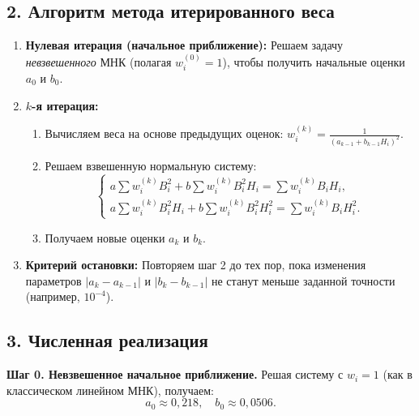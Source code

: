 \documentclass{article}
\begin{document}
\subsection*{2. Алгоритм метода итерированного веса}

\begin{enumerate}
    \item \textbf{Нулевая итерация (начальное приближение):} Решаем задачу \textit{невзвешенного} МНК (полагая $w_i^{(0)} = 1$), чтобы получить начальные оценки $a_0$ и $b_0$.
    \item \textbf{$k$-я итерация:} 
    \begin{enumerate}
        \item Вычисляем веса на основе предыдущих оценок: $w_i^{(k)} = \frac{1}{(a_{k-1} + b_{k-1}H_i)^2}$.
        \item Решаем взвешенную нормальную систему:
        \begin{equation}
        \begin{cases}
        a \sum w_i^{(k)} B_i^2 + b \sum w_i^{(k)} B_i^2 H_i = \sum w_i^{(k)} B_i H_i, \\
        a \sum w_i^{(k)} B_i^2 H_i + b \sum w_i^{(k)} B_i^2 H_i^2 = \sum w_i^{(k)} B_i H_i^2.
        \end{cases}
        \end{equation}
        \item Получаем новые оценки $a_k$ и $b_k$.
    \end{enumerate}
    \item \textbf{Критерий остановки:} Повторяем шаг 2 до тех пор, пока изменения параметров $|a_k - a_{k-1}|$ и $|b_k - b_{k-1}|$ не станут меньше заданной точности (например, $10^{-4}$).
\end{enumerate}

\subsection*{3. Численная реализация}

\textbf{Шаг 0. Невзвешенное начальное приближение.}
Решая систему с $w_i = 1$ (как в классическом линейном МНК), получаем:
\begin{equation}
a_0 \approx 0{,}218, \quad b_0 \approx 0{,}0506.
\end{equation}
\end{document}
